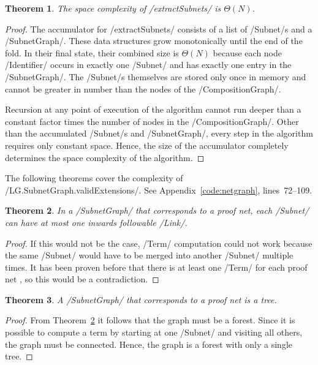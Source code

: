 \documentclass[12pt,a4paper]{article}
\newtheorem{theorem}{Theorem}
\begin{document}
\begin{theorem}\label{thm:netgraph-space}
    The space complexity of \hs/extractSubnets/ is $\Theta(N)$.
\end{theorem}
\begin{proof}
    The accumulator for \hs/extractSubnets/ consists of a list of \hs/Subnet/s and a \hs/SubnetGraph/. These data structures grow monotonically until the end of the fold. In their final state, their combined size is $\Theta(N)$ because each node \hs/Identifier/ occurs in exactly one \hs/Subnet/ and has exactly one entry in the \hs/SubnetGraph/. The \hs/Subnet/s themselves are stored only once in memory and cannot be greater in number than the nodes of the \hs/CompositionGraph/.
    
    Recursion at any point of execution of the algorithm cannot run deeper than a constant factor times the number of nodes in the \hs/CompositionGraph/. Other than the accumulated \hs/Subnet/s and \hs/SubnetGraph/, every step in the algorithm requires only constant space. Hence, the size of the accumulator completely determines the space complexity of the algorithm.
\end{proof}

The following theorems cover the complexity of \hs/LG.SubnetGraph.validExtensions/. See Appendix~\ref{code:netgraph}, lines~72--109.
\begin{theorem}\label{thm:inwards-links}
    In a \hs/SubnetGraph/ that corresponds to a proof net, each \hs/Subnet/ can have at most one inwards followable \hs/Link/.
\end{theorem}
\begin{proof}
    If this would not be the case, \hs/Term/ computation could not work because the same \hs/Subnet/ would have to be merged into another \hs/Subnet/ multiple times. It has been proven before that there is at least one \hs/Term/ for each proof net \cite[p.~11]{mm12}, so this would be a contradiction.
\end{proof}

\begin{theorem}\label{thm:tree}
    A \hs/SubnetGraph/ that corresponds to a proof net is a tree.
\end{theorem}
\begin{proof}
    From Theorem~\ref{thm:inwards-links} it follows that the graph must be a forest. Since it is possible to compute a term by starting at one \hs/Subnet/ and visiting all others, the graph must be connected. Hence, the graph is a forest with only a single tree.
\end{proof}
\end{document}
